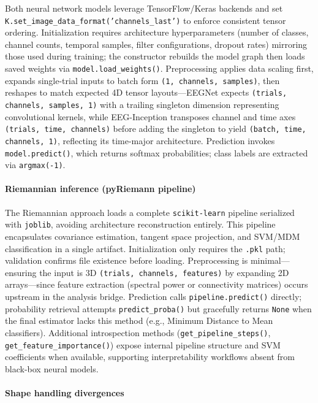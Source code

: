 \documentclass[12pt]{report}
\begin{document}
Both neural network models leverage TensorFlow/Keras backends and set \texttt{K.set\_image\_data\_format('channels\_last')} to enforce consistent tensor ordering. Initialization requires architecture hyperparameters (number of classes, channel counts, temporal samples, filter configurations, dropout rates) mirroring those used during training; the constructor rebuilds the model graph then loads saved weights via \texttt{model.load\_weights()}. Preprocessing applies data scaling first, expands single-trial inputs to batch form \texttt{(1, channels, samples)}, then reshapes to match expected 4D tensor layouts—EEGNet expects \texttt{(trials, channels, samples, 1)} with a trailing singleton dimension representing convolutional kernels, while EEG-Inception transposes channel and time axes \texttt{(trials, time, channels)} before adding the singleton to yield \texttt{(batch, time, channels, 1)}, reflecting its time-major architecture. Prediction invokes \texttt{model.predict()}, which returns softmax probabilities; class labels are extracted via \texttt{argmax(-1)}.

\paragraph{Riemannian inference (pyRiemann pipeline)}\mbox{}

The Riemannian approach loads a complete \texttt{scikit-learn} pipeline serialized with \texttt{joblib}, avoiding architecture reconstruction entirely. This pipeline encapsulates covariance estimation, tangent space projection, and SVM/MDM classification in a single artifact. Initialization only requires the \texttt{.pkl} path; validation confirms file existence before loading. Preprocessing is minimal—ensuring the input is 3D \texttt{(trials, channels, features)} by expanding 2D arrays—since feature extraction (spectral power or connectivity matrices) occurs upstream in the analysis bridge. Prediction calls \texttt{pipeline.predict()} directly; probability retrieval attempts \texttt{predict\_proba()} but gracefully returns \texttt{None} when the final estimator lacks this method (e.g., Minimum Distance to Mean classifiers). Additional introspection methods (\texttt{get\_pipeline\_steps()}, \texttt{get\_feature\_importance()}) expose internal pipeline structure and SVM coefficients when available, supporting interpretability workflows absent from black-box neural models.

\paragraph{Shape handling divergences}\mbox{}
\end{document}
